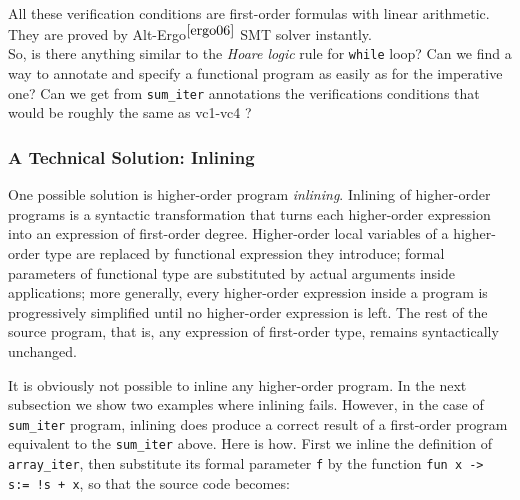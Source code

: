 \documentclass[a4paper,11pt,oneside]{article}
\theoremstyle{plain}
\begin{document}
	All these verification conditions are first-order formulas with linear arithmetic. 
	They are proved by Alt-Ergo$^{\cite{ergo06}}$ SMT solver instantly. \\
	
	So, is there anything similar to the \textit{Hoare logic} rule for \texttt{while} loop?
	Can we find a way to annotate and specify a functional program as easily as for the imperative one? 
	Can we get from \texttt{sum\_iter} annotations the verifications conditions that would be roughly the same as vc1-vc4 ?
	
\subsubsection*{A Technical Solution: Inlining}
	\qquad One possible solution is higher-order program \textit{inlining}.
	Inlining of higher-order programs is a syntactic transformation that turns
each higher-order expression into an expression of first-order degree. 
	Higher-order local variables of a higher-order type are replaced by functional expression they introduce; 
	formal parameters of functional type are substituted by actual arguments inside applications; 
	more generally, every higher-order expression inside a program is progressively simplified until no higher-order expression is left. 
	The rest of the source program, that is, any expression of first-order
type, remains syntactically unchanged. 

	It is obviously not possible to inline any higher-order program. 
	In the next subsection we show two examples where inlining fails. 
	However, in the case of \texttt{sum\_iter} program, inlining does produce a correct result of a first-order program equivalent to the \texttt{sum\_iter} above.
	Here is how. 
	First we inline the definition of \texttt{array\_iter}, then substitute its formal parameter \texttt{f} by the function \texttt{fun x -> s:= !s + x}, so that the source code becomes:
\end{document}

